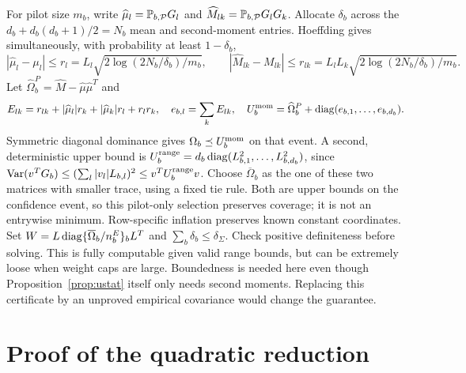 For pilot size $m_b$, write $\widehat\mu_l=\mathbb P_{b,\mathcal P}G_l$ and
$\widehat M_{lk}=\mathbb P_{b,\mathcal P}G_lG_k$. Allocate $\delta_b$ across the
$d_b+d_b(d_b+1)/2=N_b$ mean and second-moment entries. Hoeffding gives
simultaneously, with probability at least $1-\delta_b$,
\[
 |\widehat\mu_l-\mu_l|\le r_l=L_l\sqrt{2\log(2N_b/\delta_b)/m_b},\qquad
 |\widehat M_{lk}-M_{lk}|\le r_{lk}=L_lL_k\sqrt{2\log(2N_b/\delta_b)/m_b}.
\]
Let $\widehat\Omega_b^P=\widehat M-\widehat\mu\widehat\mu^T$ and
\[
 E_{lk}=r_{lk}+|\widehat\mu_l|r_k+|\widehat\mu_k|r_l+r_lr_k,
 \quad e_{b,l}=\sum_k E_{lk},\quad
 U_b^{\rm mom}=\widehat\Omega_b^P+\operatorname{diag}(e_{b,1},\ldots,e_{b,d_b}).
\]
Symmetric diagonal dominance gives $\Omega_b\preceq U_b^{\rm mom}$ on
that event. A second, deterministic upper bound is
$U_b^{\rm range}=d_b\operatorname{diag}(L_{b,1}^2,\ldots,L_{b,d_b}^2)$, since
$\operatorname{Var}(v^TG_b)\le(\sum_l|v_l|L_{b,l})^2\le v^TU_b^{\rm range}v$.
Choose $\overline\Omega_b$ as the one of these two matrices with smaller
trace, using a fixed tie rule. Both are upper bounds on the confidence event,
so this pilot-only selection preserves coverage; it is not an entrywise
minimum. Row-specific inflation preserves known constant coordinates.
Set
$W=L\operatorname{diag}\{\overline\Omega_b/n_b^E\}_bL^T$ and
$\sum_b\delta_b\le\delta_\Sigma$. Check positive definiteness before solving.
This is fully computable given valid range bounds, but can be extremely loose
when weight caps are large. Boundedness is needed here even though
Proposition~\ref{prop:ustat} itself only needs second moments. Replacing this
certificate by an unproved empirical covariance would change the guarantee.

\section{Proof of the quadratic reduction}\label{app:quadratic}

